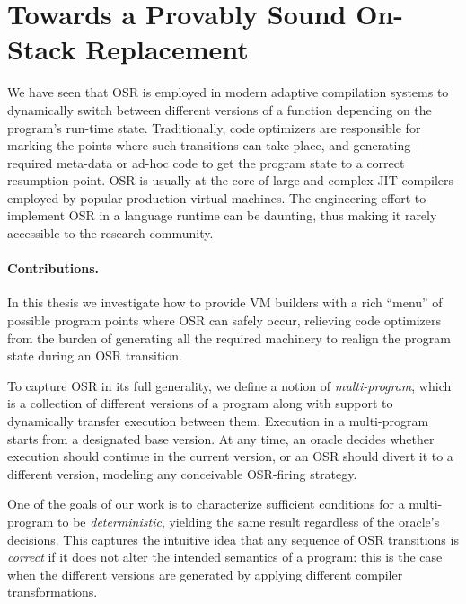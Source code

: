 
\section{Towards a Provably Sound On-Stack Replacement}
\label{se:osr-a-la-carte}

We have seen that OSR is employed in modern adaptive compilation systems to dynamically switch between different versions of a function depending on the program's run-time state. Traditionally, code optimizers are responsible for marking the points where such transitions can take place, and generating required meta-data or ad-hoc code to get the program state to a correct resumption point. OSR is usually at the core of large and complex JIT compilers employed by popular production virtual machines. The engineering effort to implement OSR in a language runtime can be daunting, thus making it rarely accessible to the research community.%

\paragraph*{Contributions.} In this thesis we investigate how to provide VM builders with a rich ``menu'' of possible program points where OSR can safely occur, relieving code optimizers from the burden of generating all the required machinery to realign the program state during an OSR transition.

To capture OSR in its full generality, we define a notion of {\em multi-program}, which is a collection of different versions of a program along with support to dynamically transfer execution between them. Execution in a multi-program starts from a designated base version. At any time, an oracle decides whether execution should continue in the current version, or an OSR should divert it to a different version, modeling any conceivable OSR-firing strategy.

One of the goals of our work is to characterize sufficient conditions for a multi-program to be {\em deterministic}, yielding the same result regardless of the oracle's decisions. This captures the intuitive idea that any sequence of OSR transitions is {\em correct} if it does not alter the intended semantics of a program: this is the case when the different versions are generated by applying different compiler transformations.

